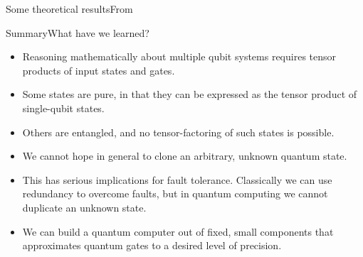 \begin{frame}{Some theoretical results}{From \Kaye{}}
\end{frame}

\begin{frame}{Summary}{What have we learned?}

\begin{itemize}[<+->]
  \item Reasoning mathematically about multiple qubit systems requires tensor products of input states and gates.
  \item Some states are pure, in that they can be expressed as the tensor product of single-qubit states.
  \item Others are entangled, and no  tensor-factoring of such states is possible.
  \item We cannot hope in general to clone an arbitrary, unknown quantum state.
  \item This has serious implications for fault tolerance.  Classically we can use redundancy to overcome faults, but in quantum computing we cannot duplicate an unknown state.
  \item We can build a quantum computer out of fixed, small components that approximates quantum gates to a desired level of precision.
\end{itemize}
    
\end{frame}
